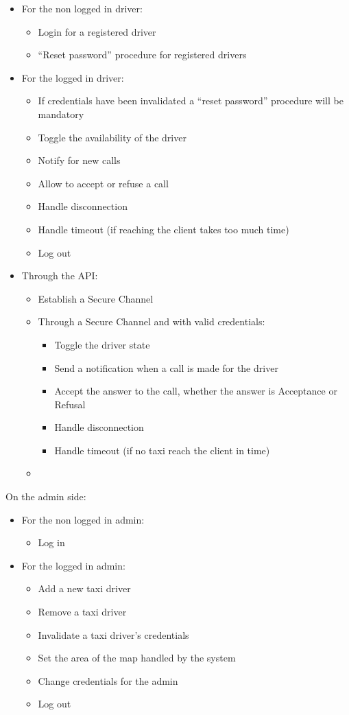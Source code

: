 \documentclass{article}
\begin{document}
\begin{itemize}
	\item For the non logged in driver:
		\begin{itemize}
			\item Login for a registered driver 
			\item ``Reset password'' procedure for registered drivers
		\end{itemize}
	\item For the logged in driver:
		\begin{itemize}
			\item If credentials have been invalidated a ``reset password'' procedure will be mandatory
			\item Toggle the availability of the driver
			\item Notify for new calls
			\item Allow to accept or refuse a call
			\item Handle disconnection 
			\item Handle timeout (if reaching the client takes too much time)
			\item Log out
		\end{itemize}
	\item Through the API:\@
		\begin{itemize}
			\item Establish a Secure Channel
			\item Through a Secure Channel and with valid credentials:\@
				\begin{itemize}
					\item Toggle the driver state
					\item Send a notification when a call is made for the driver
					\item Accept the answer to the call, whether the answer is Acceptance or Refusal
					\item Handle disconnection
					\item Handle timeout (if no taxi reach the client in time)%
				\end{itemize}
			\item 
		\end{itemize}
\end{itemize}
On the admin side:\@
\begin{itemize}
	\item For the non logged in admin:
		\begin{itemize}
			\item Log in
		\end{itemize}
	\item For the logged in admin:
		\begin{itemize}
			\item Add a new taxi driver
			\item Remove a taxi driver
			\item Invalidate a taxi driver's credentials 
			\item Set the area of the map handled by the system
			\item Change credentials for the admin
			\item Log out
		\end{itemize}
\end{itemize}
\end{document}
